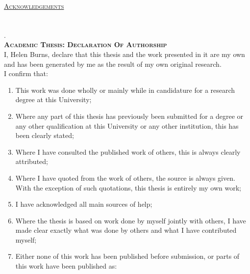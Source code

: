 \documentclass[a4paper,12pt, openright, titlepage]{book}
\begin{document}



\newpage{}
\textsc{\large \uline{Acknowledgements}}\\
\clearpage

\chapter[Declaration of authorship]{}
. \\[-6.51cm]
\textbf{\textsc{\Large Academic Thesis: Declaration Of Authorship}}\\[0.5cm]


\noindent I, Helen Burns, declare that this thesis and the work presented in it are my own and has been generated by me as the result of my own original research.\\[0.3cm]


\noindent I confirm that:\\[-1.5cm]
\begin{enumerate}
\item This work was done wholly or mainly while in candidature for a research degree at this University;
\item Where any part of this thesis has previously been submitted for a degree or any other qualification at this University or any other institution, this has been clearly stated;
\item Where I have consulted the published work of others, this is always clearly attributed;
\item Where I have quoted from the work of others, the source is always given. With the exception of such quotations, this thesis is entirely my own work;
\item I have acknowledged all main sources of help;
\item Where the thesis is based on work done by myself jointly with others, I have made clear exactly what was done by others and what I have contributed myself;
\item Either none of this work has been published before submission, or parts of this work have been published as: \\

\end{enumerate}
\end{document}
